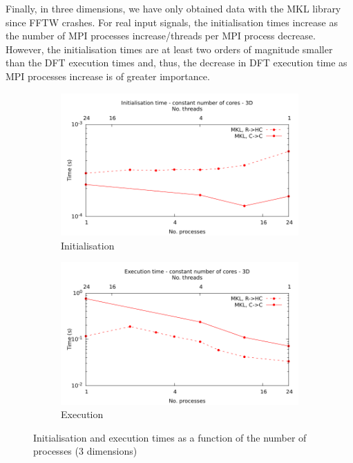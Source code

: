 \documentclass[12pt, a4paper]{article} \setlength{\textheight}{24cm}
\begin{document}
Finally, in three dimensions, we have only obtained data with the MKL
library since FFTW crashes. For real input signals, the initialisation
times increase as the number of MPI processes increase/threads per MPI
process decrease. However, the initialisation times are at least two
orders of magnitude smaller than the DFT execution times and, thus,
the decrease in DFT execution time as MPI processes increase is of
greater importance.
\begin{figure}[H]
  \centering
  \begin{subfigure}{.5\textwidth}
    \centering
    \includegraphics[width=.9\linewidth]{graphs/const-init-3d.pdf}
    \caption{Initialisation}
    \label{3DCONSTI}
  \end{subfigure}%
  \begin{subfigure}{.5\textwidth}
    \centering
    \includegraphics[width=.9\linewidth]{graphs/const-exec-3d.pdf}
    \caption{Execution}
    \label{3DCONSTE}
  \end{subfigure}
  \caption{Initialisation and execution times as a function of the
    number of processes (3 dimensions)}
  \label{3DCONST}
\end{figure}
\end{document}
